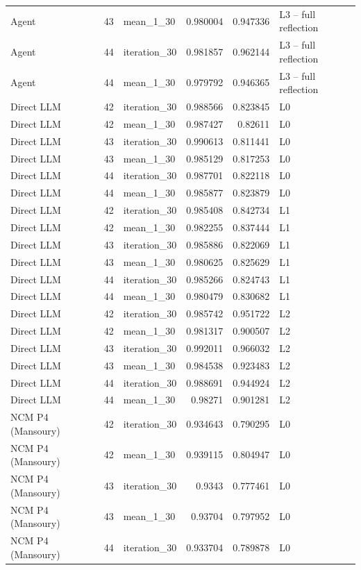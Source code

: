 \begin{table}[htbp!]
\begin{tabular}{lrlrrl}
Agent & 43 & mean\_1\_30 & 0.980004 & 0.947336 & L3 -- full reflection \\
Agent & 44 & iteration\_30 & 0.981857 & 0.962144 & L3 -- full reflection \\
Agent & 44 & mean\_1\_30 & 0.979792 & 0.946365 & L3 -- full reflection \\
Direct LLM & 42 & iteration\_30 & 0.988566 & 0.823845 & L0 \\
Direct LLM & 42 & mean\_1\_30 & 0.987427 & 0.82611 & L0 \\
Direct LLM & 43 & iteration\_30 & 0.990613 & 0.811441 & L0 \\
Direct LLM & 43 & mean\_1\_30 & 0.985129 & 0.817253 & L0 \\
Direct LLM & 44 & iteration\_30 & 0.987701 & 0.822118 & L0 \\
Direct LLM & 44 & mean\_1\_30 & 0.985877 & 0.823879 & L0 \\
Direct LLM & 42 & iteration\_30 & 0.985408 & 0.842734 & L1 \\
Direct LLM & 42 & mean\_1\_30 & 0.982255 & 0.837444 & L1 \\
Direct LLM & 43 & iteration\_30 & 0.985886 & 0.822069 & L1 \\
Direct LLM & 43 & mean\_1\_30 & 0.980625 & 0.825629 & L1 \\
Direct LLM & 44 & iteration\_30 & 0.985266 & 0.824743 & L1 \\
Direct LLM & 44 & mean\_1\_30 & 0.980479 & 0.830682 & L1 \\
Direct LLM & 42 & iteration\_30 & 0.985742 & 0.951722 & L2 \\
Direct LLM & 42 & mean\_1\_30 & 0.981317 & 0.900507 & L2 \\
Direct LLM & 43 & iteration\_30 & 0.992011 & 0.966032 & L2 \\
Direct LLM & 43 & mean\_1\_30 & 0.984538 & 0.923483 & L2 \\
Direct LLM & 44 & iteration\_30 & 0.988691 & 0.944924 & L2 \\
Direct LLM & 44 & mean\_1\_30 & 0.98271 & 0.901281 & L2 \\
NCM P4 (Mansoury) & 42 & iteration\_30 & 0.934643 & 0.790295 & L0 \\
NCM P4 (Mansoury) & 42 & mean\_1\_30 & 0.939115 & 0.804947 & L0 \\
NCM P4 (Mansoury) & 43 & iteration\_30 & 0.9343 & 0.777461 & L0 \\
NCM P4 (Mansoury) & 43 & mean\_1\_30 & 0.93704 & 0.797952 & L0 \\
NCM P4 (Mansoury) & 44 & iteration\_30 & 0.933704 & 0.789878 & L0 \\

\end{tabular}
\end{table}
